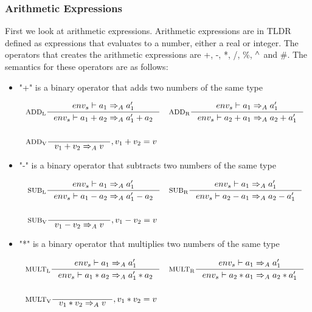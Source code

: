 \subsubsection{Arithmetic Expressions}

First we look at arithmetic expressions. Arithmetic expressions are in TLDR defined as expressions that evaluates to a number, either a real or integer. The operators that creates the arithmetic expressions are +, -, *, /, \%, $^\wedge{}$ and \#. The semantics for these operators are as follows:

\begin{itemize}
\item "+" is a binary operator that adds two numbers of the same type

\begin{align*}
&\inference[$\text{ADD}_\text{L}$]{env_s \vdash a_1 \Rightarrow_A a_1'}
                    {env_s \vdash  a_1 + a_2 \Rightarrow_A a_1' + a_2}
&
&\inference[$\text{ADD}_\text{R}$]{env_s\vdash a_1 \Rightarrow_A a_1'}
                    {env_s\vdash a_2 + a_1 \Rightarrow_A a_2 + a_1'}
\\\\
&\inference[$\text{ADD}_\text{V}$]{}
                    {v_1 + v_2 \Rightarrow_A v}
                    {, v_1 + v_2 = v}
\end{align*}

\item "-" is a binary operator that subtracts two numbers of the same type

\begin{align*}
&\inference[$\text{SUB}_\text{L}$]{env_s\vdash a_1 \Rightarrow_A a_1'}
                    {env_s\vdash a_1 - a_2 \Rightarrow_A a_1' - a_2}
&
&\inference[$\text{SUB}_\text{R}$]{env_s\vdash a_1 \Rightarrow_A a_1'}
                    {env_s\vdash a_2 - a_1 \Rightarrow_A a_2 - a_1'}
\\\\
&\inference[$\text{SUB}_\text{V}$]{}
                    {v_1 - v_2 \Rightarrow_A v}
                    {, v_1 - v_2 = v}
\end{align*}

\item "*" is a binary operator that multiplies two numbers of the same type

\begin{align*}
&\inference[$\text{MULT}_\text{L}$]{env_s\vdash a_1 \Rightarrow_A a_1'}
                     {env_s\vdash a_1 * a_2 \Rightarrow_A a_1' * a_2}
&
&\inference[$\text{MULT}_\text{R}$]{env_s\vdash a_1 \Rightarrow_A a_1'}
                     {env_s\vdash a_2 * a_1 \Rightarrow_A a_2 * a_1'}
\\\\
&\inference[$\text{MULT}_\text{V}$]{}
                     {v_1 * v_2 \Rightarrow_A v}
                     {, v_1 * v_2 = v}
\end{align*}


\end{itemize}
